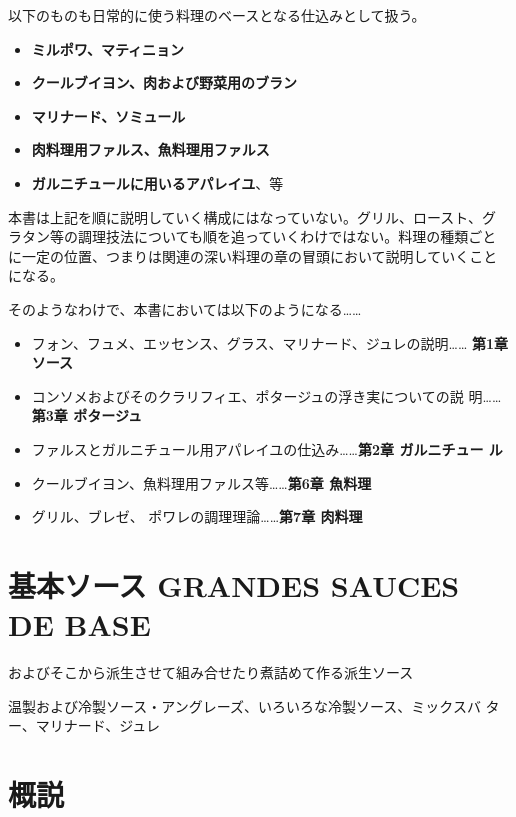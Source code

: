 \documentclass[twoside,12Q,b5paper]{escoffierltjsbook}
\def\tightlist{\itemsep1pt\parskip0pt\parsep0pt}
\begin{document}
以下のものも日常的に使う料理のベースとなる仕込みとして扱う。

\begin{itemize}
\tightlist
\item
  \textbf{ミルポワ、マティニョン}
\item
  \textbf{クールブイヨン、肉および野菜用のブラン}
\item
  \textbf{マリナード、ソミュール}
\item
  \textbf{肉料理用ファルス、魚料理用ファルス}
\item
  \textbf{ガルニチュールに用いるアパレイユ}、等
\end{itemize}

本書は上記を順に説明していく構成にはなっていない。グリル、ロースト、グ
ラタン等の調理技法についても順を追っていくわけではない。料理の種類ごと
に一定の位置、つまりは関連の深い料理の章の冒頭において説明していくこと
になる。

そのようなわけで、本書においては以下のようになる\ldots{}\ldots{}

\begin{itemize}
\tightlist
\item
  フォン、フュメ、エッセンス、グラス、マリナード、ジュレの説明\ldots{}\ldots{}
  \textbf{ 第1章 ソース}
\item
  コンソメおよびそのクラリフィエ、ポタージュの浮き実についての説
  明\ldots{}\ldots{}\textbf{第3章 ポタージュ}
\item
  ファルスとガルニチュール用アパレイユの仕込み\ldots{}\ldots{}\textbf{第2章
  ガルニチュー ル}
\item
  クールブイヨン、魚料理用ファルス等\ldots{}\ldots{}\textbf{第6章
  魚料理}
\item
  グリル、ブレゼ、 ポワレの調理理論\ldots{}\ldots{}\textbf{第7章 肉料理}
\end{itemize}

\newpage

\section{基本ソース GRANDES SAUCES DE
BASE}\label{ux57faux672cux30bdux30fcux30b9-grandes-sauces-de-base}

およびそこから派生させて組み合せたり煮詰めて作る派生ソース

温製および冷製ソース・アングレーズ、いろいろな冷製ソース、ミックスバ
ター、マリナード、ジュレ

\section{概説}\label{ux6982ux8aac}
\end{document}
